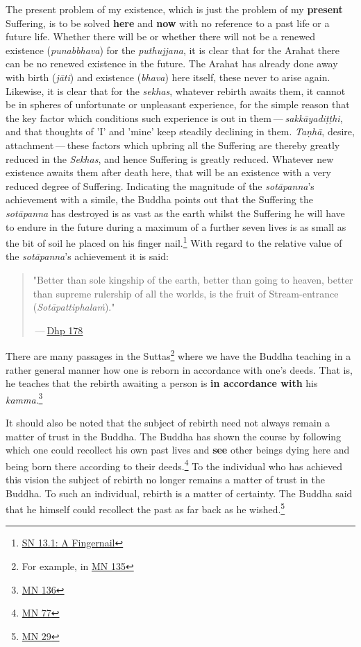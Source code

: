 The present problem of my existence, which is just the problem of my \textbf{present} Suffering, is to be solved \textbf{here} and \textbf{now} with no reference to a past life or a future life. Whether there will be or whether there will not be a renewed existence (\emph{punabbhava}) for the \emph{puthujjana}, it is clear that for the Arahat there can be no renewed existence in the future. The Arahat has already done away with birth (\emph{jāti}) and existence (\emph{bhava}) here itself, these never to arise again. Likewise, it is clear that for the \emph{sekhas}, whatever rebirth awaits them, it cannot be in spheres of unfortunate or unpleasant experience, for the simple reason that the key factor which conditions such experience is out in them --- \emph{sakkāyadiṭṭhi}, and that thoughts of 'I' and 'mine' keep steadily declining in them. \emph{Taṇhā}, desire, attachment --- these factors which upbring all the Suffering are thereby greatly reduced in the \emph{Sekhas}, and hence Suffering is greatly reduced. Whatever new existence awaits them after death here, that will be an existence with a very reduced degree of Suffering. Indicating the magnitude of the \emph{sotāpanna}'s achievement with a simile, the Buddha points out that the Suffering the \emph{sotāpanna} has destroyed is as vast as the earth whilst the Suffering he will have to endure in the future during a maximum of a further seven lives is as small as the bit of soil he placed on his finger nail.\footnote{\href{https://suttacentral.net/sn13.1/en/sujato}{SN 13.1: A Fingernail}} With regard to the relative value of the \emph{sotāpanna}'s achievement it is said:

\begin{quote}
"Better than sole kingship of the earth, better than going to heaven, better than supreme rulership of all the worlds, is the fruit of Stream-entrance (\emph{Sotāpattiphalaṁ})."

 --- \href{https://suttacentral.net/dhp167-178/en/sujato}{Dhp 178}
\end{quote}

There are many passages in the Suttas\footnote{For example, in \href{https://suttacentral.net/mn135/en/bodhi}{MN 135}} where we have the Buddha teaching in a rather general manner how one is reborn in accordance with one's deeds. That is, he teaches that the rebirth awaiting a person is \textbf{in accordance with} his \emph{kamma}.\footnote{\href{https://suttacentral.net/mn136/en/thanissaro}{MN 136}}

It should also be noted that the subject of rebirth need not always remain a matter of trust in the Buddha. The Buddha has shown the course by following which one could recollect his own past lives and \textbf{see} other beings dying here and being born there according to their deeds.\footnote{\href{https://suttacentral.net/mn77/en/bodhi}{MN 77}} To the individual who has achieved this vision the subject of rebirth no longer remains a matter of trust in the Buddha. To such an individual, rebirth is a matter of certainty. The Buddha said that he himself could recollect the past as far back as he wished.\footnote{\href{https://suttacentral.net/mn29/en/bodhi}{MN 29}}

